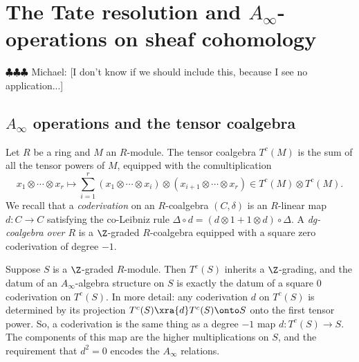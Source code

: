 \documentclass[12pt]{amsart}
\theoremstyle{definition}
\theoremstyle{remark}
\newcommand{\michael}[1]{{\color{red} \sf $\clubsuit\clubsuit\clubsuit$ Michael: [#1]}}
\begin{document}
\section{The Tate resolution and $A_\infty$-operations on sheaf cohomology}

\michael{I don't know if we should include this, because I see no application...}

\subsection{$A_\infty$ operations and the tensor coalgebra}
Let $R$ be a ring and $M$ an $R$-module. The tensor coalgebra $T^c(M)$ is the sum of all the tensor powers of $M$, equipped with the comultiplication
$$
x_1 \otimes \cdots \otimes x_r \mapsto \sum_{i = 1}^r (x_1 \otimes \cdots \otimes x_i) \otimes (x_{i + 1} \otimes \cdots \otimes x_r) \in T^c(M) \otimes T^c(M).
$$
We recall that a \emph{coderivation} on an $R$-coalgebra $(C, \delta)$ is an $R$-linear map $d: C \to C$ satisfying the co-Leibniz rule $\Delta \circ d = (d \otimes 1 + 1 \otimes d) \circ \Delta$.  A \emph{dg-coalgebra over $R$} is a $\Z$-graded $R$-coalgebra equipped with a square zero coderivation of degree $-1$.

Suppose $S$ is a $\Z$-graded $R$-module. Then $T^c(S)$ inherits a $\Z$-grading, and the datum of an $A_\infty$-algebra structure on $S$ is exactly the datum of a square 0 coderivation on $T^c(S)$. In more detail: any coderivation $d$ on $T^c(S)$ is determined by its projection $T^c(S) \xra{d} T^c(S) \onto S$ onto the first tensor power. So, a coderivation is the same thing as a degree $-1$ map $d : T^c(S) \to S$. The components of this map are the higher multiplications on $S$, and the requirement that $d^2= 0$ encodes the $A_\infty$ relations. 
\end{document}
